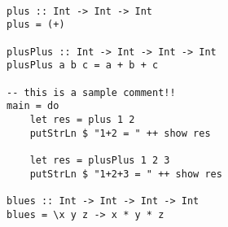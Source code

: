 \documentclass[12pt]{article}
\begin{document}
\pagecolor{bgcolor}\color{fgcolor} 

\begin{lstlisting} 

plus :: Int -> Int -> Int
plus = (+)

plusPlus :: Int -> Int -> Int -> Int
plusPlus a b c = a + b + c

-- this is a sample comment!!
main = do
    let res = plus 1 2
    putStrLn $ "1+2 = " ++ show res

    let res = plusPlus 1 2 3
    putStrLn $ "1+2+3 = " ++ show res

blues :: Int -> Int -> Int -> Int
blues = \x y z -> x * y * z

\end{lstlisting} 
\end{document}
